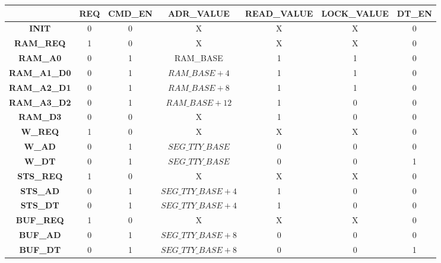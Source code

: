 \documentclass[10pt]{article}
\begin{document}
\begin{tabular}{|c|c|c|c|c|c|c|}
  \hline
  & {\bf REQ} & {\bf CMD\_EN} & {\bf ADR\_VALUE} & {\bf READ\_VALUE} & {\bf LOCK\_VALUE} & {\bf DT\_EN} \\ \hline
  \hline
  {\bf INIT} & 0 & 0 & X & X & X & 0 \\ \hline
  \hline
  {\bf RAM\_REQ} & 1 & 0 & X & X & X & 0 \\ \hline
  {\bf RAM\_A0} & 0 & 1 & RAM\_BASE & 1 & 1 & 0 \\ \hline
  {\bf RAM\_A1\_D0} & 0 & 1 & $RAM\_BASE + 4$ & 1 & 1 & 0 \\ \hline
  {\bf RAM\_A2\_D1} & 0 & 1 & $RAM\_BASE + 8$ & 1 & 1 & 0 \\ \hline
  {\bf RAM\_A3\_D2} & 0 & 1 & $RAM\_BASE + 12$ & 1 & 0 & 0 \\ \hline
  {\bf RAM\_D3} & 0 & 0 & X & 1 & 0 & 0 \\ \hline
  \hline
  {\bf W\_REQ} & 1 & 0 & X & X & X & 0 \\ \hline
  {\bf W\_AD} & 0 & 1 & $SEG\_TTY\_BASE$ & 0 & 0 & 0 \\ \hline
  {\bf W\_DT} & 0 & 1 & $SEG\_TTY\_BASE$ & 0 & 0 & 1 \\ \hline
  \hline
  {\bf STS\_REQ} & 1 & 0 & X & X & X & 0 \\ \hline
  {\bf STS\_AD} & 0 & 1 & $SEG\_TTY\_BASE + 4$ & 1 & 0 & 0 \\ \hline
  {\bf STS\_DT} & 0 & 1 & $SEG\_TTY\_BASE + 4$ & 1 & 0 & 0 \\ \hline
  \hline
  {\bf BUF\_REQ} & 1 & 0 & X & X & X & 0 \\ \hline
  {\bf BUF\_AD} & 0 & 1 & $SEG\_TTY\_BASE + 8$ & 0 & 0 & 0 \\ \hline
  {\bf BUF\_DT} & 0 & 1 & $SEG\_TTY\_BASE + 8$ & 0 & 0 & 1 \\ \hline
\end{tabular}

\newpage
\end{document}
